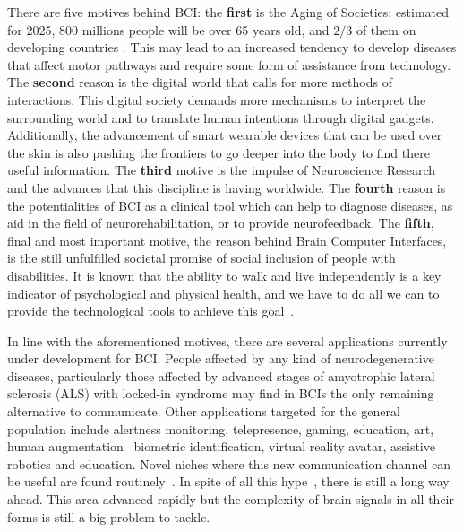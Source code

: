 
There are five motives behind BCI: the \textbf{first} is the Aging of Societies: estimated for 2025, 800 millions people will be over 65 years old, and $2/3$ of them on developing countries \cite{LloydSherlock2000}.  This may lead to an increased tendency to develop diseases that affect motor pathways and require some form of assistance from technology.  The \textbf{second} reason is the digital world that calls for more methods of interactions. This digital society demands more mechanisms to interpret the surrounding world and to translate human intentions through digital gadgets.  Additionally, the advancement of smart wearable devices that can be used over the skin is also pushing the frontiers to go deeper into the body to find there useful information.  The \textbf{third} motive is the impulse of Neuroscience Research and the advances that this discipline is having worldwide.  The \textbf{fourth} reason is the potentialities of BCI as a clinical tool which can help to diagnose diseases, as aid in the field of neurorehabilitation,  or to provide neurofeedback.  The \textbf{fifth}, final and most important motive, the reason behind Brain Computer Interfaces, is the still unfulfilled societal promise of social inclusion of people with disabilities.  It is known that the ability to walk and live independently is a key indicator of psychological and physical health, and we have to do all we can to provide the technological tools to achieve this goal~\cite{Rao2013,Clerc2016,WolpawJonathanR2012,Huggins2015}. 

In line with the aforementioned motives, there are several applications currently under development for BCI.  People affected by any kind of neurodegenerative diseases, particularly those affected by advanced stages of amyotrophic lateral sclerosis (ALS) with locked-in syndrome may find in BCIs the only remaining alternative to communicate. Other applications targeted for the general population include alertness monitoring, telepresence, gaming, education, art, human augmentation~\cite{Yuste2017} biometric identification, virtual reality avatar, assistive robotics and education.  Novel niches where this new communication channel can be useful are found routinely~\cite{Nam2018}. In spite of all this hype~\cite{GartnerHype2016}, there is still a long way ahead.  This area advanced rapidly but the complexity of brain signals in all their forms is still a big problem to tackle.  

